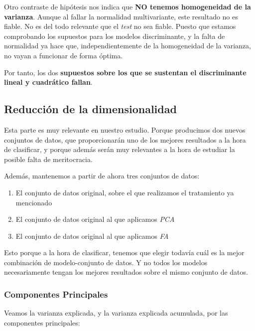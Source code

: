 \documentclass[11pt]{article}
\begin{document}
Otro contraste de hipótesis nos indica que \textbf{NO tenemos homogeneidad de la varianza}. Aunque al fallar la normalidad multivariante, este resultado no es fiable. No es del todo relevante que el \textit{test} no sea fiable. Puesto que estamos comprobando los supuestos para los modelos discriminante, y la falta de normalidad ya hace que, independientemente de la homogeneidad de la varianza, no vayan a funcionar de forma óptima.

Por tanto, los dos \textbf{supuestos sobre los que se sustentan el discriminante lineal y cuadrático fallan}.


\subsection{Reducción de la dimensionalidad}

Esta parte es muy relevante en nuestro estudio. Porque producimos dos nuevos conjuntos de datos, que proporcionarán uno de los mejores resultados a la hora de clasificar, y porque además serán muy relevantes a la hora de estudiar la posible falta de meritocracia.

Además, mantenemos a partir de ahora tres conjuntos de datos:

\begin{enumerate}
    \item El conjunto de datos original, sobre el que realizamos el tratamiento ya mencionado
    \item El conjunto de datos original al que aplicamos \textit{PCA}
    \item El conjunto de datos original al que aplicamos \textit{FA}
\end{enumerate}

Esto porque a la hora de clasificar, tenemos que elegir todavía cuál es la mejor combinación de modelo-conjunto de datos. Y no todos los modelos necesariamente tengan los mejores resultados sobre el mismo conjunto de datos.

\subsubsection{Componentes Principales}

Veamos la varianza explicada, y la varianza explicada acumulada, por las componentes principales:
\end{document}
